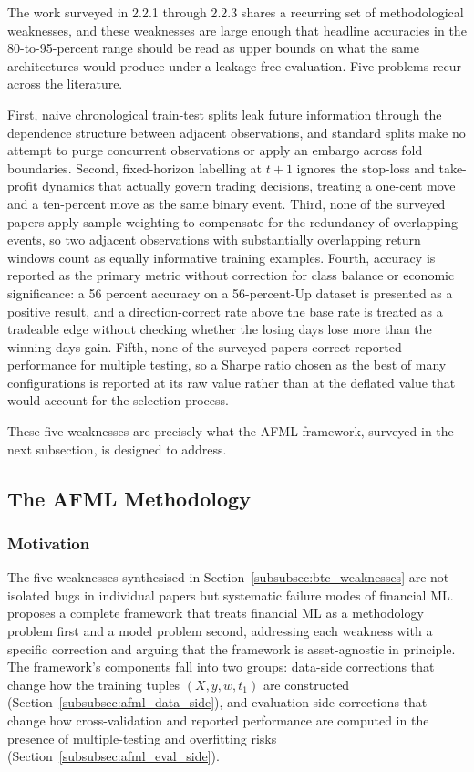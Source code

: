 \documentclass[12pt,a4paper,oneside]{article}
\begin{document}
The work surveyed in 2.2.1 through 2.2.3 shares a recurring set of methodological weaknesses, and these weaknesses are large enough that headline accuracies in the 80-to-95-percent range should be read as upper bounds on what the same architectures would produce under a leakage-free evaluation. Five problems recur across the literature.

First, naive chronological train-test splits leak future information through the dependence structure between adjacent observations, and standard splits make no attempt to purge concurrent observations or apply an embargo across fold boundaries. Second, fixed-horizon labelling at $t+1$ ignores the stop-loss and take-profit dynamics that actually govern trading decisions, treating a one-cent move and a ten-percent move as the same binary event. Third, none of the surveyed papers apply sample weighting to compensate for the redundancy of overlapping events, so two adjacent observations with substantially overlapping return windows count as equally informative training examples. Fourth, accuracy is reported as the primary metric without correction for class balance or economic significance: a 56 percent accuracy on a 56-percent-Up dataset is presented as a positive result, and a direction-correct rate above the base rate is treated as a tradeable edge without checking whether the losing days lose more than the winning days gain. Fifth, none of the surveyed papers correct reported performance for multiple testing, so a Sharpe ratio chosen as the best of many configurations is reported at its raw value rather than at the deflated value that would account for the selection process.

These five weaknesses are precisely what the AFML framework, surveyed in the next subsection, is designed to address.


\subsection{The AFML Methodology}\label{subsec:lit_afml}

\subsubsection{Motivation}\label{subsubsec:afml_motivation}

The five weaknesses synthesised in Section~\ref{subsubsec:btc_weaknesses} are not isolated bugs in individual papers but systematic failure modes of financial ML. \citet{lopez_de_prado_2018} proposes a complete framework that treats financial ML as a methodology problem first and a model problem second, addressing each weakness with a specific correction and arguing that the framework is asset-agnostic in principle. The framework's components fall into two groups: data-side corrections that change how the training tuples $(X, y, w, t_1)$ are constructed (Section~\ref{subsubsec:afml_data_side}), and evaluation-side corrections that change how cross-validation and reported performance are computed in the presence of multiple-testing and overfitting risks (Section~\ref{subsubsec:afml_eval_side}).
\end{document}
